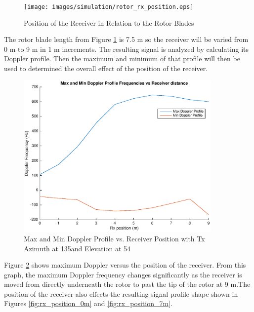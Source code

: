 \begin{figure}
	\begin{center}
		\texttt{[image: images/simulation/rotor\_rx\_position.eps]}
		\caption{Position of the Receiver in Relation to the Rotor Blades}
		\label{fig:rx_position_image}
	\end{center}
\end{figure}

The rotor blade length from Figure \ref{fig:rx_position_image} is 7.5 m so the receiver will be varied from 0 m to 9 m in 1 m increments. The resulting signal is analyzed by calculating its Doppler profile. Then the maximum and minimum of that profile will then be used to determined the overall effect of the position of the receiver.

\begin{figure}
	\begin{center}
		\includegraphics[width=10cm]{images/simulation/receiver_position_max_doppler.eps}
		\caption{Max and Min Doppler Profile vs. Receiver Position with Tx Azimuth at 135\textdegree \space and Elevation at 54\textdegree}
		\label{fig:rx_position}
	\end{center}
\end{figure}

Figure \ref{fig:rx_position} shows maximum Doppler versus the position of the receiver. From this graph, the maximum Doppler frequency changes significantly as the receiver is moved from directly underneath the rotor to past the tip of the rotor at 9 m.The position of the receiver also effects the resulting signal profile shape shown in Figures \ref{fig:rx_position_0m} and \ref{fig:rx_position_7m}.

